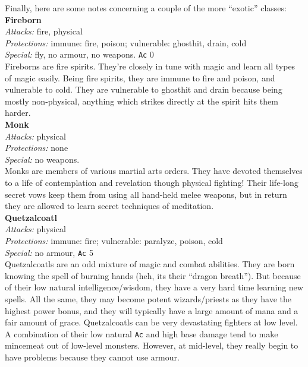 Finally, here are some notes concerning a couple of the more ``exotic'' classes:\\

\noindent{$\bullet$} {\bf Fireborn} \\
{\sl Attacks:} fire, physical \\
{\sl Protections:} immune: fire, poison; vulnerable: ghosthit, drain, cold \\
{\sl Special:} fly, no armour, no weapons. {\tt Ac} 0 \\
Fireborns are fire spirits. They're closely in tune with
magic and learn all types of magic easily.
Being fire spirits, they are
immune to fire and poison, and vulnerable to cold. They are vulnerable to
ghosthit and drain because being mostly non-physical, anything which strikes
directly at the spirit hits them harder. \\

\noindent{$\bullet$} {\bf Monk} \\
{\sl Attacks:} physical \\
{\sl Protections:} none \\
{\sl Special:} no weapons. \\
Monks are members of various martial arts orders. They have devoted themselves to
a life of contemplation and revelation though physical fighting! Their
life-long secret vows keep them from using all hand-held melee weapons,
but in return they are allowed to learn secret techniques of meditation. \\

\noindent{$\bullet$} {\bf Quetzalcoatl} \\
{\sl Attacks:} physical \\
{\sl Protections:} immune: fire; vulnerable: paralyze, poison, cold \\
{\sl Special:} no armour, {\tt Ac} 5 \\
Quetzalcoatls are an odd mixture of magic and combat abilities. They are
born knowing the spell of burning hands (heh, its their ``dragon breath'').
But because of their low natural intelligence/wisdom, they have a very hard
time learning new spells. All the same, they may become potent
wizards/priests as they have the highest power bonus, and they will
typically have a large amount of mana and a fair amount of grace.
Quetzalcoatls can be very
devastating fighters at low level. A combination of  their low natural {\tt Ac}
and high base damage tend to make mincemeat
out of low-level monsters. However, at mid-level, they really begin to have
problems because they cannot use armour. \\

